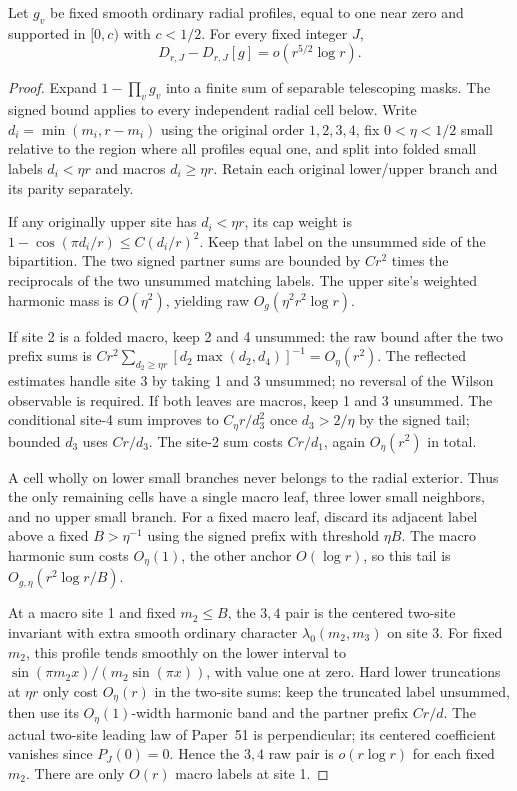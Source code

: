 \begin{proposition}\label{prop:radial}
Let \(g_v\) be fixed smooth ordinary radial profiles, equal to one near zero and supported in \([0,c)\) with \(c<1/2\). For every fixed integer \(J\),
\[
                   D_{r,J}-D_{r,J}[g]=o(r^{5/2}\log r).
\]
\end{proposition}
\begin{proof}
Expand \(1-\prod_v g_v\) into a finite sum of separable telescoping masks. The signed bound applies to every independent radial cell below. Write \(d_i=\min(m_i,r-m_i)\) using the original order \(1,2,3,4\), fix \(0<\eta<1/2\) small relative to the region where all profiles equal one, and split into folded small labels \(d_i<\eta r\) and macros \(d_i\ge\eta r\). Retain each original lower/upper branch and its parity separately.

If any originally upper site has \(d_i<\eta r\), its cap weight is \(1-\cos(\pi d_i/r)\le C(d_i/r)^2\). Keep that label on the unsummed side of the bipartition. The two signed partner sums are bounded by \(Cr^2\) times the reciprocals of the two unsummed matching labels. The upper site's weighted harmonic mass is \(O(\eta^2)\), yielding raw \(O_g(\eta^2r^2\log r)\).

If site 2 is a folded macro, keep 2 and 4 unsummed: the raw bound after the two prefix sums is
\(Cr^2\sum_{d_2\ge\eta r}[d_2\max(d_2,d_4)]^{-1}
=O_\eta(r^2)\).
The reflected estimates handle site 3 by taking 1 and 3 unsummed; no reversal of the Wilson observable is required. If both leaves are macros, keep 1 and 3 unsummed. The conditional site-4 sum improves to \(C_\eta r/d_3^2\) once \(d_3>2/\eta\) by the signed tail; bounded \(d_3\) uses \(Cr/d_3\). The site-2 sum costs \(Cr/d_1\), again \(O_\eta(r^2)\) in total.

A cell wholly on lower small branches never belongs to the radial exterior. Thus the only remaining cells have a single macro leaf, three lower small neighbors, and no upper small branch. For a fixed macro leaf, discard its adjacent label above a fixed \(B>\eta^{-1}\) using the signed prefix with threshold \(\eta B\). The macro harmonic sum costs \(O_\eta(1)\), the other anchor \(O(\log r)\), so this tail is \(O_{g,\eta}(r^2\log r/B)\).

At a macro site 1 and fixed \(m_2\le B\), the \(3,4\) pair is the centered two-site invariant with extra smooth ordinary character \(\lambda_0(m_2,m_3)\) on site 3. For fixed \(m_2\), this profile tends smoothly on the lower interval to \(\sin(\pi m_2 x)/(m_2\sin(\pi x))\), with value one at zero. Hard lower truncations at \(\eta r\) only cost \(O_\eta(r)\) in the two-site sums: keep the truncated label unsummed, then use its \(O_\eta(1)\)-width harmonic band and the partner prefix \(Cr/d\). The actual two-site leading law of Paper~51 is perpendicular; its centered coefficient vanishes since \(P_J(0)=0\). Hence the \(3,4\) raw pair is \(o(r\log r)\) for each fixed \(m_2\). There are only \(O(r)\) macro labels at site 1.


\end{proof}
